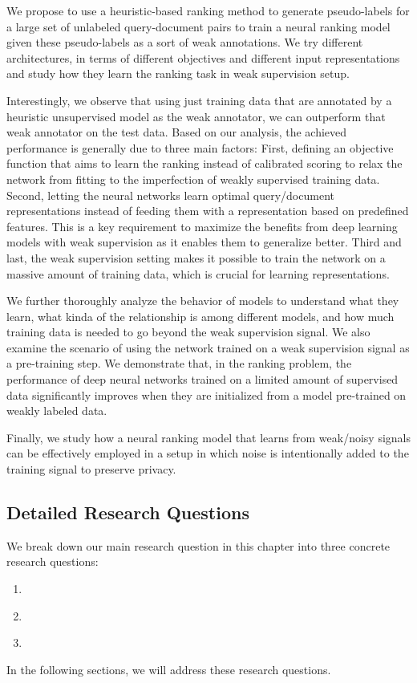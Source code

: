 We propose to use a heuristic-based ranking method to generate pseudo-labels for a large set of unlabeled query-document pairs to train a neural ranking model given these pseudo-labels as a sort of weak annotations.  We try different architectures, in terms of different objectives and different input representations and study how they learn the ranking task in weak supervision setup.

Interestingly, we observe that using just training data that are annotated by a heuristic unsupervised model as the weak annotator, we can outperform that weak annotator on the test data. Based on our analysis, the achieved performance is generally due to three main factors: 
%
First, defining an objective function that aims to learn the ranking instead of calibrated scoring to relax the network from fitting to the imperfection of weakly supervised training data.
%
Second, letting the neural networks learn optimal query/document representations instead of feeding them with a representation based on predefined features. This is a key requirement to maximize the benefits from deep learning models with weak supervision as it enables them to generalize better.
%
Third and last, the weak supervision setting makes it possible to train the network on a massive amount of training data, which is crucial for learning representations.
%

We further thoroughly analyze the behavior of models to understand what they learn, what kinda of the relationship is among different models, and how much training data is needed to go beyond the weak supervision signal. 
%
We also examine the scenario of using the network trained on a weak supervision signal as a pre-training step. We demonstrate that, in the ranking problem, the performance of deep neural networks trained on a limited amount of supervised data significantly improves when they are initialized from a model pre-trained on weakly labeled data.

Finally, we study how a neural ranking model that learns from weak/noisy signals can be effectively employed in a setup in which noise is intentionally added to the training signal to preserve privacy.


\subsection{Detailed Research Questions}
We break down our main research question in this chapter into three concrete research questions:
\begin{resqbox}
\begin{enumerate}
\item[\textbf{\resqname{c4.1}}] \emph{}
\item[\textbf{\resqname{c4.2}}] \emph{}
\item[\textbf{\resqname{c4.3}}] \emph{}
\end{enumerate}
\end{resqbox}
In the following sections, we will address these research questions.





